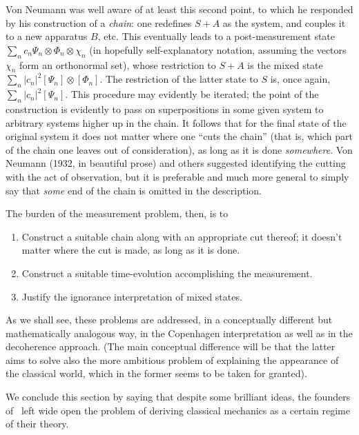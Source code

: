 \documentclass[12pt]{article}
\newcommand{\ot}{\otimes}
\newcommand{\ch}{\chi} \newcommand{\ps}{\psi} \newcommand{\Ps}{\Psi}
\begin{document}
Von Neumann was well aware of at least this second point, to which he responded by his construction of a {\it chain}: one redefines $S+A$ as the system, and couples it to a new apparatus $B$, etc. This eventually leads to a post-measurement state $\sum_n c_n \Psi_n \ot\Phi_n\ot \ch_n$ (in hopefully self-explanatory notation, assuming the vectors $\ch_n$ form an orthonormal set), whose restriction to $S+A$ is the mixed
state  $\sum_n |c_n|^2 [\Psi_n]\ot [\Phi_n]$.
The restriction of the latter state to $S$ is, once again, $\sum_n |c_n|^2  [\Psi_n]$. This procedure may evidently be iterated; the point of the construction is evidently to pass on superpositions in some given system to arbitrary systems higher up in the chain.
It follows that for the final state of the original system it does not matter where one ``cuts the chain'' (that is, which part of  the chain one leaves out of consideration), as long as it is done {\it somewhere}. Von Neumann (1932, in beautiful prose) and others suggested identifying the cutting with the act of observation, but it is preferable and much more general to  simply say that {\it some} end of the chain is omitted in the description. 

The burden of the  measurement problem, then, is to \begin{enumerate}
\item Construct a suitable chain along with an appropriate cut thereof;  it doesn't matter where the cut is made, as long as it is done.
\item Construct a suitable time-evolution accomplishing the measurement.
 \item Justify the  ignorance interpretation of mixed states. 
\end{enumerate}
As we shall see, these problems are addressed, in a conceptually different but mathematically analogous way, in the 
Copenhagen interpretation as well as in the decoherence approach.
(The main conceptual difference will be that the latter aims to solve also the more ambitious problem of explaining the appearance of the classical world, which in the former seems to be taken for granted). 
\bigskip

We conclude this section by saying that despite some brilliant ideas, the founders of \qm\ left  wide open the problem of deriving classical mechanics as a certain regime of their theory. 
\end{document}
